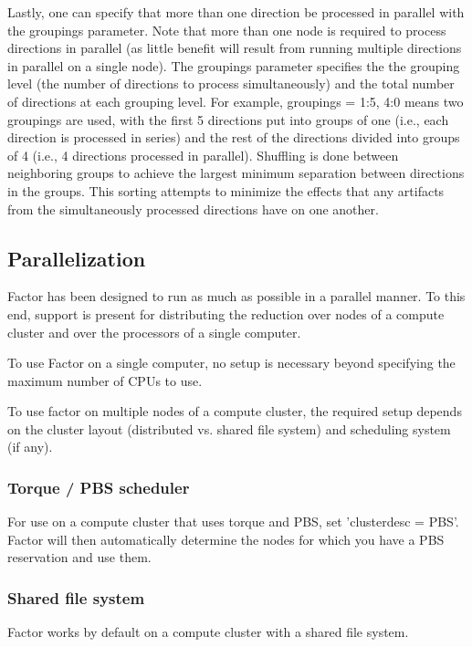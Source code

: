 \documentclass[structabstract]{article}
\begin{document}
{Lastly, one can specify that more than one direction be processed in
parallel with the groupings parameter. Note that more than one node is required
to process directions in parallel (as little benefit will result from running
multiple directions in parallel on a single node). The groupings parameter specifies the the
grouping level (the number of directions to process simultaneously) and the
total number of directions at each grouping level. For example, groupings = 1:5,
4:0 means two groupings are used, with the first 5 directions put into groups of
one (i.e., each direction is processed in series) and the rest of the directions
divided into groups of 4 (i.e., 4 directions processed in parallel). Shuffling
is done between neighboring groups to achieve the largest minimum separation
between directions in the groups. This sorting attempts to minimize the effects that
any artifacts from the simultaneously processed directions have on one another.


\subsection{Parallelization}
\label{factor:parallel}

Factor has been designed to run as much as possible in a parallel manner. To
this end, support is present for distributing the reduction over nodes of a
compute cluster and over the processors of a single computer.

To use Factor on a single computer, no setup is necessary beyond specifying the
maximum number of CPUs to use.

To use factor on multiple nodes of a compute cluster, the required setup depends
on the cluster layout (distributed vs. shared file system) and scheduling system
(if any).

\subsubsection{Torque / PBS scheduler}
For use on a compute cluster that uses torque and PBS, set 'clusterdesc = PBS'.
Factor will then automatically determine the nodes for which you have a PBS
reservation and use them.

\subsubsection{Shared file system}
Factor works by default on a compute cluster with a shared file system.

}
\end{document}
